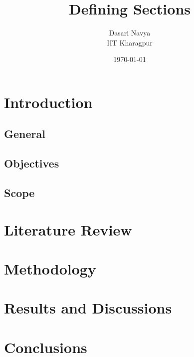 \documentclass{article}
\title{Defining Sections}
\author{Dasari Navya \\ IIT Kharagpur}
\date{\today}
\begin{document}
	\maketitle
	
	\section{Introduction}
	
		\subsection{General}
	
		\subsection{Objectives}
	
		\subsection{Scope}
	
	\section{Literature Review}
	
	\section{Methodology}
	
	\section{Results and Discussions}
	
	\section{Conclusions}
\end{document}
